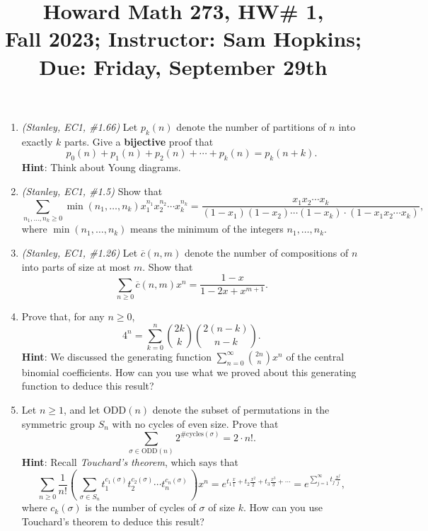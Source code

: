 \documentclass[11pt]{article}
\title{Howard Math 273, HW\# 1, \\ {\normalsize Fall 2023; Instructor: Sam Hopkins; Due: Friday, September 29th}}
\date{}
\begin{document}
\maketitle

\thispagestyle{empty}


\begin{enumerate}

\item \emph{(Stanley, EC1, \#1.66)} Let $p_k(n)$ denote the number of partitions of $n$ into exactly $k$ parts. Give a {\bf bijective} proof that
\[p_0(n)+p_1(n)+p_2(n)+\cdots + p_k(n) = p_k(n+k).\]
{\bf Hint}: Think about Young diagrams.

\item \emph{(Stanley, EC1, \#1.5)} Show that 
\[ \sum_{n_1,\ldots, n_k \geq 0} \min(n_1,\ldots,n_k) x_1^{n_1}x_2^{n_2}\cdots x_k^{n_k} = \frac{x_1x_2\cdots x_k}{(1-x_1)(1-x_2)\cdots(1-x_k) \cdot (1-x_1x_2\cdots x_k)}, \]
where $ \min(n_1,\ldots,n_k)$ means the minimum of the integers $n_1,\ldots,n_k$.

\item \emph{(Stanley, EC1, \#1.26)} Let $\overline{c}(n,m)$ denote the number of compositions of $n$ into parts of size at most $m$. Show that
\[ \sum_{n\geq 0} \overline{c}(n,m)x^n = \frac{1-x}{1-2x+x^{m+1}}.\]

\item Prove that, for any $n \geq 0$,
\[ 4^n = \sum_{k=0}^{n} \binom{2k}{k}\binom{2(n-k)}{n-k}. \]
{\bf Hint}: We discussed the generating function $\sum_{n=0}^{\infty} \binom{2n}{n}x^n$ of the central binomial coefficients. How can you use what we proved about this generating function to deduce this result?

\item Let $n \geq 1$, and let $\mathrm{ODD}(n)$ denote the subset of permutations in the symmetric group $S_n$ with no cycles of even size. Prove that
\[ \sum_{\sigma \in \mathrm{ODD}(n)} 2^{\#\mathrm{cycles}(\sigma)} = 2\cdot n!. \]
{\bf Hint}: Recall \emph{Touchard's theorem}, which says that
\[ \sum_{n \geq 0} \frac{1}{n!} \left( \, \sum_{\sigma\in S_n}t_1^{c_1(\sigma)} t_2^{c_2(\sigma)} \cdots t_n^{c_n(\sigma)} \, \right)  x^n = e^{t_1\frac{x}{1} + t_2\frac{x^2}{2} + t_3\frac{x^3}{3}+\cdots} = e^{\sum_{j=1}^{\infty} t_j\frac{x^j}{j}},\]
where $c_k(\sigma)$ is the number of cycles of $\sigma$ of size $k$. How can you use Touchard's theorem to deduce this result?


\end{enumerate}
\end{document}
